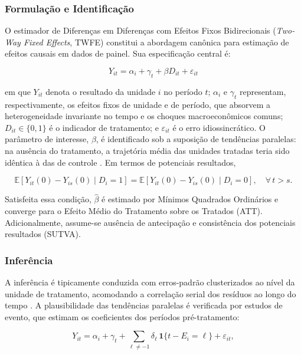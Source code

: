\documentclass[a4paper,12pt]{article}
\begin{document}
\subsubsection{Formulação e Identificação}

O estimador de Diferenças em Diferenças com Efeitos Fixos Bidirecionais
(\textit{Two-Way Fixed Effects}, TWFE) constitui a abordagem canônica para estimação de
efeitos causais em dados de painel. Sua especificação central é:

\begin{equation}
Y_{it} = \alpha_i + \gamma_t + \beta D_{it} + \varepsilon_{it}
\end{equation}

em que $Y_{it}$ denota o resultado da unidade $i$ no período $t$; $\alpha_i$ e $\gamma_t$
representam, respectivamente, os efeitos fixos de unidade e de período, que absorvem a
heterogeneidade invariante no tempo e os choques macroeconômicos comuns;
$D_{it} \in \{0,1\}$ é o indicador de tratamento; e $\varepsilon_{it}$ é o erro
idiossincrático. O parâmetro de interesse, $\beta$, é identificado sob a suposição de
tendências paralelas: na ausência do tratamento, a trajetória
média das unidades tratadas teria sido idêntica à das de controle \cite{angrist2009}. Em
termos de potenciais resultados,

\begin{equation}
\mathbb{E}[Y_{it}(0) - Y_{is}(0) \mid D_i = 1] =
\mathbb{E}[Y_{it}(0) - Y_{is}(0) \mid D_i = 0], \quad \forall\, t > s.
\end{equation}

Satisfeita essa condição, $\hat{\beta}$ é estimado por Mínimos Quadrados Ordinários e
converge para o Efeito Médio do Tratamento sobre os Tratados (ATT). Adicionalmente,
assume-se ausência de antecipação e consistência dos potenciais
resultados (SUTVA).

\subsubsection{Inferência}

A inferência é tipicamente conduzida com erros-padrão clusterizados ao nível da unidade
de tratamento, acomodando a correlação serial dos resíduos ao longo do tempo
\cite{bertrand2004}. A plausibilidade das tendências paralelas é verificada por estudos de
evento, que estimam os coeficientes dos períodos pré-tratamento:

\begin{equation}
Y_{it} = \alpha_i + \gamma_t + \sum_{\ell \neq -1} \delta_\ell\,
\mathbf{1}\{t - E_i = \ell\} + \varepsilon_{it},
\end{equation}
\end{document}
